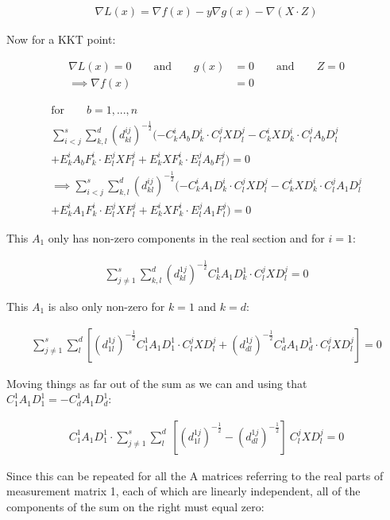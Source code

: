 \documentclass{article}
\begin{document}
\begin{align}
	\nabla L(x) = \nabla f(x) - y \nabla g(x) - \nabla (X \cdot Z)
\end{align}

Now for a KKT point:

\begin{align}
	\nabla L(x) = 0 \qquad \text{and} \qquad g(x) &= 0 \qquad \text{and} \qquad Z = 0 \\
	\implies \nabla f(x) &= 0
\end{align}

\begin{align}
	\text{for} \qquad b = {1,...,n} \\
	\sum_{i<j}^s \sum_{k,l}^d (d_{kl}^{ij})^{-\frac{1}{2}}(-C_k^i A_b D_k^i \cdot C_l^j X D_l^j - C_k^i X D_k^i \cdot C_l^j A_b D_l^j \\
	+ E_k^i A_b F_k^i \cdot E_l^j X F_l^j + E_k^i X F_k^i \cdot E_l^j A_b F_l^j)  = 0 \\
	\implies \sum_{i<j}^s \sum_{k,l}^d (d_{kl}^{ij})^{-\frac{1}{2}}(-C_k^i A_1 D_k^i \cdot C_l^j X D_l^j - C_k^i X D_k^i \cdot C_l^j A_1 D_l^j \\
	+ E_k^i A_1 F_k^i \cdot E_l^j X F_l^j + E_k^i X F_k^i \cdot E_l^j A_1 F_l^j)  = 0
\end{align}

This $A_1$ only has non-zero components in the real section and for $i = 1$:

\begin{align}
	\sum_{j\ne 1}^s \sum_{k,l}^d (d_{kl}^{1j})^{-\frac{1}{2}} C_k^1 A_1 D_k^1 \cdot C_l^j X D_l^j = 0
\end{align}

This $A_1$ is also only non-zero for $k = 1$ and $k = d$:

\begin{align}
	\sum_{j\ne 1}^s \sum_{l}^d [(d_{1l}^{1j})^{-\frac{1}{2}} C_1^1 A_1 D_1^1 \cdot C_l^j X D_l^j + (d_{dl}^{1j})^{-\frac{1}{2}} C_d^1 A_1 D_d^1 \cdot C_l^j X D_l^j ] = 0
\end{align}

Moving things as far out of the sum as we can and using that $C_1^1 A_1 D_1^1 = -C_d^1 A_1 D_d^1$:

\begin{align}
	C_1^1 A_1 D_1^1 \cdot \sum_{j\ne 1}^s \sum_{l}^d ~ [ (d_{1l}^{1j})^{-\frac{1}{2}} - (d_{dl}^{1j})^{-\frac{1}{2}}] ~ C_l^j X D_l^j = 0
\end{align}

Since this can be repeated for all the A matrices referring to the real parts of measurement matrix 1, each of which are linearly independent, all of the components of the sum on the right must equal zero:
\end{document}
